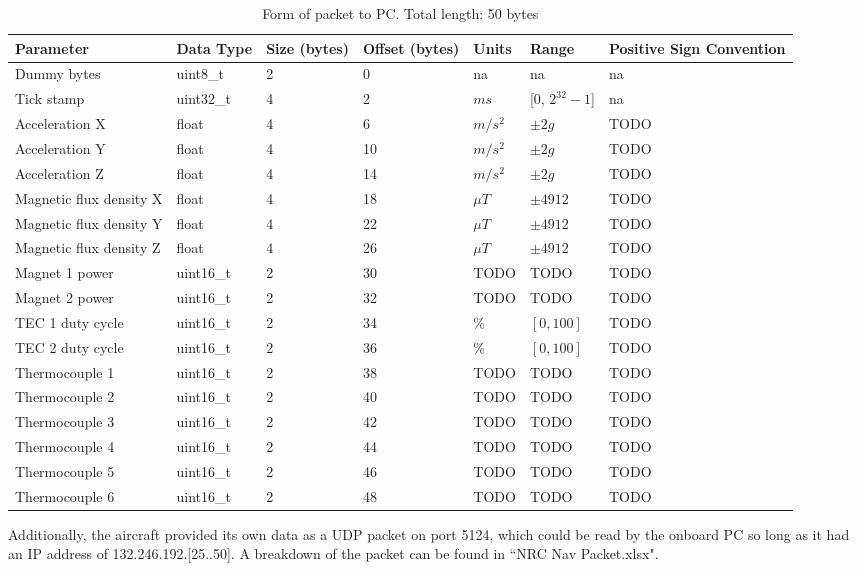 \documentclass{article}
\begin{document}
\begin{table}[!ht]
	\centering
	\begin{tabular}{ | m{4cm} | m{2cm} | m{2cm} | m{2cm}| m{1cm}| m{2cm}| m{2cm}|  } 
		\hline
		Parameter & Data Type & Size (bytes) & Offset (bytes) & Units & Range & Positive Sign Convention \\
		\hline
		Dummy bytes & uint8\_t & 2 & 0 & na & na & na \\
		\hline
		Tick stamp & uint32\_t & 4 & 2 & $ms$ & [0, $2^{32}-1$] & na \\ 
		\hline
		Acceleration X & float & 4 & 6 & $m/s^2$ & $\pm 2g$ & TODO \\ 
		\hline
		Acceleration Y & float & 4 & 10 & $m/s^2$ & $\pm 2g$ & TODO \\ 
		\hline
		Acceleration Z & float & 4 & 14 & $m/s^2$ & $\pm 2g$ & TODO \\ 
		\hline
		Magnetic flux density X & float & 4 & 18 & $\mu T$ & $\pm 4912$ & TODO \\ 
		\hline
		Magnetic flux density Y & float & 4 & 22 & $\mu T$ & $\pm 4912$ & TODO \\ 
		\hline
		Magnetic flux density Z & float & 4 & 26 & $\mu T$ & $\pm 4912$ & TODO \\ 
		\hline
		Magnet 1 power & uint16\_t & 2 & 30 & TODO & TODO & TODO \\ 
		\hline
		Magnet 2 power & uint16\_t & 2 & 32 & TODO & TODO & TODO \\ 
		\hline
	    TEC 1 duty cycle & uint16\_t & 2 & 34 & \% & $[0, 100]$ & TODO \\ 
		\hline
		TEC 2 duty cycle & uint16\_t & 2 & 36 & \% & $[0, 100]$ & TODO \\ 
		\hline
		Thermocouple 1 & uint16\_t & 2 & 38 & TODO & TODO & TODO \\ 
		\hline
		Thermocouple 2 & uint16\_t & 2 & 40 & TODO & TODO & TODO \\ 
		\hline
		Thermocouple 3 & uint16\_t & 2 & 42 & TODO & TODO & TODO \\ 
		\hline
		Thermocouple 4 & uint16\_t & 2 & 44 & TODO & TODO & TODO \\ 
		\hline
		Thermocouple 5 & uint16\_t & 2 & 46 & TODO & TODO & TODO \\ 
		\hline
		Thermocouple 6 & uint16\_t & 2 & 48 & TODO & TODO & TODO \\ 
		\hline
		
	\end{tabular}
	\caption{Form of packet to PC. Total length: 50 bytes}
	\label{tab:PCPacketFormat}
\end{table}

Additionally, the aircraft provided its own data as a UDP packet on port 5124, which could be read by the onboard PC so long as it had an IP address of 132.246.192.[25..50]. A breakdown of the packet can be found in ``NRC Nav Packet.xlsx".
\clearpage

\end{document}
